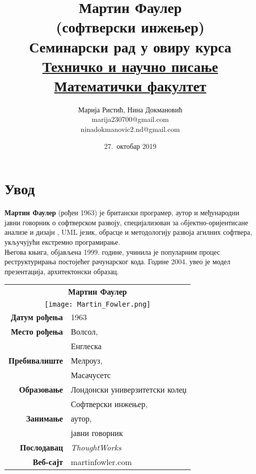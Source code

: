 \documentclass[12pt,a4paper]{article}
\begin{document}
\title{\textbf{Мартин Фаулер \\(софтверски инжењер)}\\ \small{Семинарски рад у овиру курса\\ \href{http://www.itkomunikacija.matf.bg.ac.rs/TehnickoINaucnoPisanje.html}{Техничко и научно писање}\\ \href{http://www.matf.bg.ac.rs/}{Математички факултет}}}
\author{Марија Ристић, Нина Докмановић\\marija230700@gmail.com\\ninadokmanovic2.nd@gmail.com}
\date{27.~октобар 2019}

\maketitle
\tableofcontents
\newpage

\section{{Увод}}
\label{sec:uvod}
\textbf{Мартин Фаулер} (рођен 1963) је британски програмер, аутор и међународни јавни говорник о софтверском развоју, специјализован за oбјектно-оријентисане анализе и дизајн , UML језик, обрасце и методологију развоја агилних софтвера, укључујући екстремно програмирање. \\Његова књига, објављена 1999. године, учинила је популарним процес реструктурирања постојећег рачунарског кода\cite{k_1}. Године 2004. увео је модел презентација, архитектонски образац.\cite{k_2}
\bigskip
\begin{center}
\begin{tabular}{|r|l|}\hline
	\multicolumn{2}{|c|}{\textbf{Мартин Фаулер}}\\
	\multicolumn{2}{|c|}{\texttt{[image: Martin\_Fowler.png]}} \\
	
	\textbf{Датум рођења} & 1963 \\ \hline
	\textbf{Место рођења} & Волсол, \\
	&  Енглеска \\ \hline
	\textbf{Пребивалиште} & Мелроуз, \\
	& Масачусетс \\ \hline
	\textbf{Образовање} & Лондонски универзитетски колеџ \\ \hline
	& Софтверски инжењер, \\
	\textbf{ Занимање} & аутор, \\
	& јавни говорник \\ \hline
	\textbf{Послодавац} & \emph{ThoughtWorks} \\ \hline
	\textbf{Веб-сајт}	& 	martinfowler.com \\ \hline
\end{tabular}
\end{center}
\newpage
\end{document}
